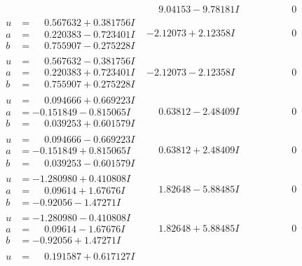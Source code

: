 \documentclass[1p]{elsarticle_modified}
\theoremstyle{definition}
\begin{document}
$$\begin{array}{c|c|c}
 & \phantom{-}9.04153 - 9.78181 I & \phantom{-0.000000 } 0 \\ \hline\begin{aligned}
u &= \phantom{-}0.567632 + 0.381756 I \\
a &= \phantom{-}0.220383 - 0.723401 I \\
b &= \phantom{-}0.755907 - 0.275228 I\end{aligned}
 & -2.12073 + 2.12358 I & \phantom{-0.000000 } 0 \\ \hline\begin{aligned}
u &= \phantom{-}0.567632 - 0.381756 I \\
a &= \phantom{-}0.220383 + 0.723401 I \\
b &= \phantom{-}0.755907 + 0.275228 I\end{aligned}
 & -2.12073 - 2.12358 I & \phantom{-0.000000 } 0 \\ \hline\begin{aligned}
u &= \phantom{-}0.094666 + 0.669223 I \\
a &= -0.151849 - 0.815065 I \\
b &= \phantom{-}0.039253 + 0.601579 I\end{aligned}
 & \phantom{-}0.63812 - 2.48409 I & \phantom{-0.000000 } 0 \\ \hline\begin{aligned}
u &= \phantom{-}0.094666 - 0.669223 I \\
a &= -0.151849 + 0.815065 I \\
b &= \phantom{-}0.039253 - 0.601579 I\end{aligned}
 & \phantom{-}0.63812 + 2.48409 I & \phantom{-0.000000 } 0 \\ \hline\begin{aligned}
u &= -1.280980 + 0.410808 I \\
a &= \phantom{-}0.09614 + 1.67676 I \\
b &= -0.92056 - 1.47271 I\end{aligned}
 & \phantom{-}1.82648 - 5.88485 I & \phantom{-0.000000 } 0 \\ \hline\begin{aligned}
u &= -1.280980 - 0.410808 I \\
a &= \phantom{-}0.09614 - 1.67676 I \\
b &= -0.92056 + 1.47271 I\end{aligned}
 & \phantom{-}1.82648 + 5.88485 I & \phantom{-0.000000 } 0 \\ \hline\begin{aligned}
u &= \phantom{-}0.191587 + 0.617127 I \\

\end{aligned}
\end{array}$$
\end{document}
